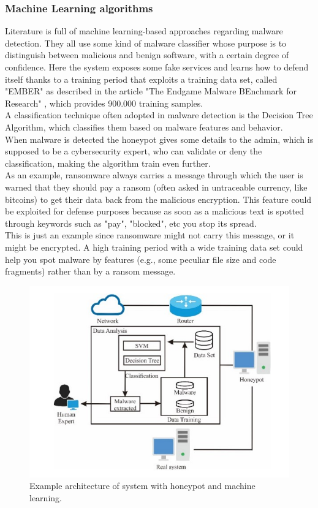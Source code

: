 \subsubsection{Machine Learning algorithms}
Literature is full of machine learning-based approaches regarding malware detection. They all use some kind of malware classifier whose purpose is to distinguish between malicious and benign software, with a certain degree of confidence. Here the system exposes some fake services and learns how to defend itself thanks to a training period that exploits a training data set, called "EMBER" as described in the article "The Endgame Malware BEnchmark for Research" \cite{https://doi.org/10.48550/arxiv.1804.04637}, which provides 900.000 training samples.\\
A classification technique often adopted in malware detection is the Decision Tree Algorithm, which classifies them based on malware features and behavior.\\
When malware is detected the honeypot gives some details to the admin, which is supposed to be a cybersecurity expert, who can validate or deny the classification, making the algorithm train even further.\\
As an example, ransomware always carries a message through which the user is warned that they should pay a ransom (often asked in untraceable currency, like bitcoins) to get their data back from the malicious encryption.
This feature could be exploited for defense purposes because as soon as a malicious text is spotted through keywords such as "pay", "blocked", etc you stop its spread.\\
This is just an example since ransomware might not carry this message, or it might be encrypted. A high training period with a wide training data set could help you spot malware by features (e.g., some peculiar file size and code fragments) rather than by a ransom message.

\begin{figure}[h]
\centering
\includegraphics[width = 14cm]{images/machineLearning.jpg}
\caption{ Example architecture of system with honeypot and machine learning.}
\label{fig:irradiances}
\end{figure}
\FloatBarrier

\newpage


